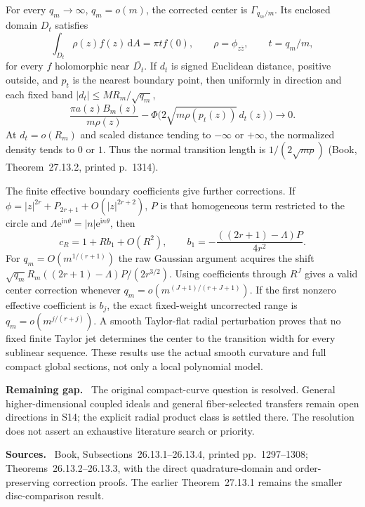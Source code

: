 \documentclass[11pt]{article}
\newcommand{\field}[1]{\par\medskip\noindent\textbf{#1.}\ }
\begin{document}
For every $q_m\to\infty$, $q_m=o(m)$, the corrected center is $\Gamma_{q_m/m}$. Its enclosed domain $D_t$ satisfies
\[
 \int_{D_t}\rho(z)f(z)\,\mathrm dA=\pi t f(0),\qquad
 \rho=\phi_{z\bar z},\qquad t=q_m/m,
\]
for every $f$ holomorphic near $\overline{D_t}$. If $d_t$ is signed Euclidean distance, positive outside, and $p_t$ is the nearest boundary point, then uniformly in direction and each fixed band $|d_t|\leq M R_m/\sqrt{q_m}$,
\[
 \frac{\pi a(z)B_m(z)}{m\rho(z)}
 -\Phi\bigl(2\sqrt{m\rho(p_t(z))}\,d_t(z)\bigr)\longrightarrow0.
\]
At $d_t=o(R_m)$ and scaled distance tending to $-\infty$ or $+\infty$, the normalized density tends to $0$ or $1$. Thus the normal transition length is $1/(2\sqrt{m\rho})$ (Book, Theorem~27.13.2, printed p.~1314).

The finite effective boundary coefficients give further corrections. If $\phi=|z|^{2r}+P_{2r+1}+O(|z|^{2r+2})$, $P$ is that homogeneous term restricted to the circle and $\Lambda\mathrm e^{\mathrm i n\theta}=|n|\mathrm e^{\mathrm i n\theta}$, then
\[
 c_R=1+Rb_1+O(R^2),\qquad
 b_1=-\frac{((2r+1)-\Lambda)P}{4r^2}.
\]
For $q_m=O(m^{1/(r+1)})$ the raw Gaussian argument acquires the shift $\sqrt{q_m}R_m((2r+1)-\Lambda)P/(2r^{3/2})$. Using coefficients through $R^J$ gives a valid center correction whenever $q_m=o(m^{(J+1)/(r+J+1)})$. If the first nonzero effective coefficient is $b_j$, the exact fixed-weight uncorrected range is $q_m=o(m^{j/(r+j)})$. A smooth Taylor-flat radial perturbation proves that no fixed finite Taylor jet determines the center to the transition width for every sublinear sequence. These results use the actual smooth curvature and full compact global sections, not only a local polynomial model.
\field{Remaining gap} The original compact-curve question is resolved. General higher-dimensional coupled ideals and general fiber-selected transfers remain open directions in S14; the explicit radial product class is settled there. The resolution does not assert an exhaustive literature search or priority.
\field{Sources} Book, Subsections~26.13.1--26.13.4, printed pp.~1297--1308; Theorems~26.13.2--26.13.3, with the direct quadrature-domain and order-preserving correction proofs. The earlier Theorem~27.13.1 remains the smaller disc-comparison result.
\end{document}
